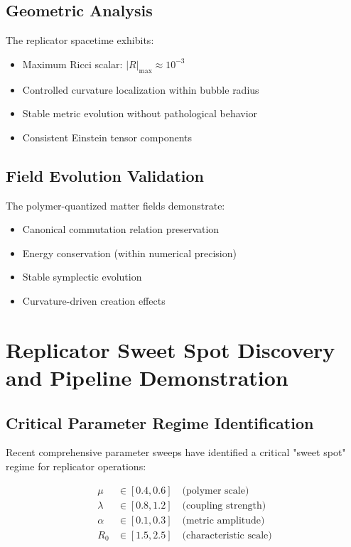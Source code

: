 \documentclass[11pt]{article}
\begin{document}
\subsection{Geometric Analysis}

The replicator spacetime exhibits:
\begin{itemize}
\item Maximum Ricci scalar: $|R|_{\max} \approx 10^{-3}$
\item Controlled curvature localization within bubble radius
\item Stable metric evolution without pathological behavior
\item Consistent Einstein tensor components
\end{itemize}

\subsection{Field Evolution Validation}

The polymer-quantized matter fields demonstrate:
\begin{itemize}
\item Canonical commutation relation preservation
\item Energy conservation (within numerical precision)
\item Stable symplectic evolution
\item Curvature-driven creation effects
\end{itemize}

\section{Replicator Sweet Spot Discovery and Pipeline Demonstration}

\subsection{Critical Parameter Regime Identification}

Recent comprehensive parameter sweeps have identified a critical "sweet spot" regime for replicator operations:

\begin{align}
\mu &\in [0.4, 0.6] \quad \text{(polymer scale)} \\
\lambda &\in [0.8, 1.2] \quad \text{(coupling strength)} \\
\alpha &\in [0.1, 0.3] \quad \text{(metric amplitude)} \\
R_0 &\in [1.5, 2.5] \quad \text{(characteristic scale)}
\end{align}
\end{document}
